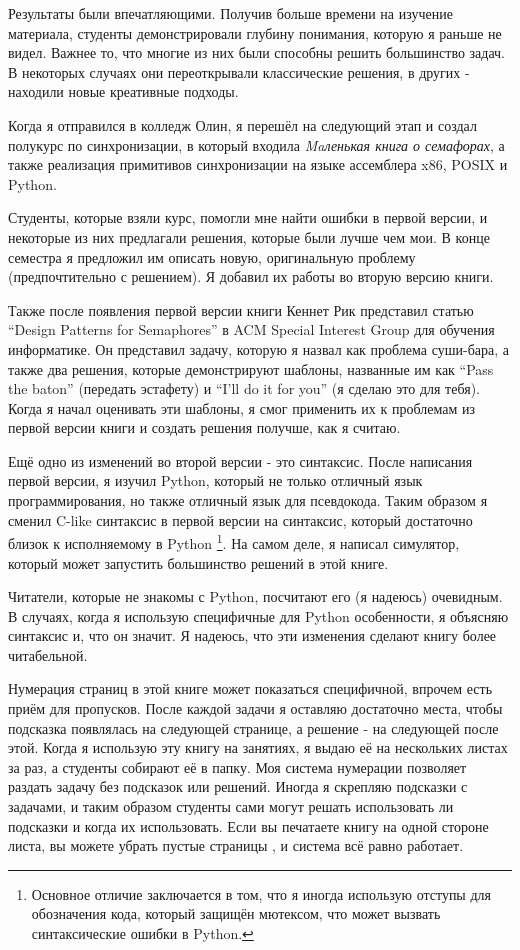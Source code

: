 Результаты были впечатляющими.
Получив больше времени на изучение материала, студенты демонстрировали
глубину понимания, которую я раньше не видел.
Важнее то, что многие из них были способны решить большинство задач.
В некоторых случаях они переоткрывали классические решения,
в других - находили новые креативные подходы.

Когда я отправился в колледж Олин, я перешёл на следующий этап
и создал полукурс по синхронизации, в который входила
{\em Maленькая книга о семафорах}, а также реализация примитивов синхронизации
на языке ассемблера x86, POSIX и Python.

Студенты, которые взяли курс, помогли мне найти ошибки в первой версии,
и некоторые из них предлагали решения, которые были лучше чем мои.
В конце семестра я предложил им описать новую, оригинальную проблему
(предпочтительно с решением).
Я добавил их работы во вторую версию книги.

Также после появления первой версии книги Кеннет Рик представил статью
``Design Patterns for Semaphores'' в ACM Special Interest Group
для обучения информатике.
Он представил задачу, которую я назвал как проблема суши-бара,
а также два решения, которые демонстрируют шаблоны, названные им как 
``Pass the baton'' (передать эстафету)
и
``I'll do it for you'' (я сделаю это для тебя).
Когда я начал оценивать эти шаблоны, я смог применить их к проблемам
из первой версии книги и создать решения получше, как я считаю.

Ещё одно из изменений во второй версии - это синтаксис.
После написания первой версии, я изучил Python, который не только
отличный язык программирования, но также отличный язык для псевдокода.
Таким образом я сменил C-like синтаксис в первой версии на синтаксис,
который достаточно близок к исполняемому в Python
\footnote{Основное отличие заключается в том, что я иногда использую
отступы для обозначения кода, который защищён мютексом, что может вызвать
синтаксические ошибки в Python.}.
На самом деле, я написал симулятор, который может запустить большинство
решений в этой книге.

Читатели, которые не знакомы с Python, посчитают его (я надеюсь) очевидным.
В случаях, когда я использую специфичные для Python особенности, я объясняю
синтаксис и, что он значит.
Я надеюсь, что эти изменения сделают книгу более читабельной.

Нумерация страниц в этой книге может показаться специфичной, впрочем есть приём
для пропусков. После каждой задачи я оставляю достаточно места, чтобы подсказка
появлялась на следующей странице, а решение - на следующей после этой.
Когда я использую эту книгу на занятиях, я выдаю её на нескольких листах за раз,
а студенты собирают её в папку.
Моя система нумерации позволяет раздать задачу без подсказок или решений.
Иногда я скрепляю подсказки с задачами, и таким образом студенты сами могут
решать использовать ли подсказки и когда их использовать.
Если вы печатаете книгу на одной стороне листа, вы можете убрать пустые страницы
, и система всё равно работает.

